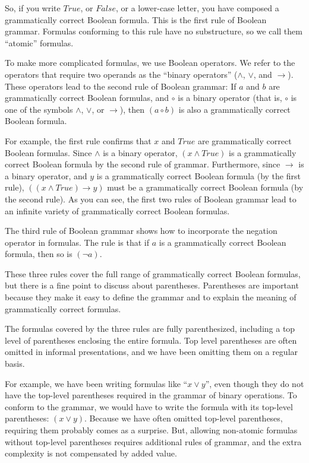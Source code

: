 So, if you write $True$, or $False$, or a lower-case letter, you have composed a grammatically correct Boolean formula. This is the first rule of Boolean grammar. Formulas conforming to this rule have no substructure, so we call them ``atomic'' formulas.

To make more complicated formulas, we use Boolean operators. We refer to the operators that require two operands as the ``binary operators'' ($\wedge$, $\vee$, and $\rightarrow$). These operators lead to the second rule of Boolean grammar: If $a$ and $b$ are grammatically correct Boolean formulas, and $\circ$ is a binary operator (that is, $\circ$ is one of the symbols $\wedge$, $\vee$, or $\rightarrow$), then $(a \circ b)$ is also a grammatically correct Boolean formula.

For example, the first rule confirms that $x$ and $True$ are grammatically correct Boolean formulas. Since $\wedge$ is a binary operator, $(x \wedge True)$ is a grammatically correct Boolean formula by the second rule of grammar. Furthermore, since $\rightarrow$ is a binary operator, and $y$ is a grammatically correct Boolean formula (by the first rule), $((x \wedge True) \rightarrow y)$ must be a grammatically correct Boolean formula (by the second rule). As you can see, the first two rules of Boolean grammar lead to an infinite variety of grammatically correct Boolean formulas.

The third rule of Boolean grammar shows how to incorporate the negation operator in formulas. The rule is that if $a$ is a grammatically correct Boolean formula, then so is $(\neg a)$.

These three rules cover the full range of grammatically correct Boolean formulas, but there is a fine point to discuss about parentheses. Parentheses are important because they make it easy to define the grammar and to explain the meaning of grammatically correct formulas.

The formulas covered by the three rules are fully parenthesized, including a top level of parentheses enclosing the entire formula. Top level parentheses are often omitted in informal presentations, and we have been omitting them on a regular basis.

For example, we have been writing formulas like ``$x \vee y$'', even though they do not have the top-level parentheses required in the grammar of binary operations. To conform to the grammar, we would have to write the formula with its top-level parentheses: $(x \vee y)$. Because we have often omitted top-level parentheses, requiring them probably comes as a surprise. But, allowing non-atomic formulas without top-level parentheses requires additional rules of grammar, and the extra complexity is not compensated by added value.

